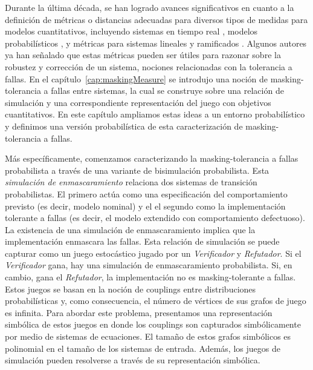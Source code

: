 Durante la última década, se han logrado avances significativos en cuanto a la definición de métricas o distancias adecuadas para diversos tipos de medidas para modelos cuantitativos, incluyendo sistemas en tiempo real \cite{HenzingerMP05}, modelos probabilísticos \cite{Bacci0LM17,BacciBLMTB19,DesharnaisGJP04,DesharnaisLT11,TangB18},
y métricas para sistemas lineales y ramificados \cite{CernyHR12,AlfaroFS09,Henzinger13,LarsenFT11,ThraneFL10}.
Algunos autores ya han señalado que estas métricas pueden ser útiles para razonar
sobre la robustez y corrección de un sistema, nociones relacionadas con la tolerancia a fallas.
En el capítulo~\ref{cap:maskingMeasure} se introdujo una noción de masking-tolerancia a fallas
entre sistemas, la cual se construye sobre una relación de simulación y una correspondiente
representación del juego con objetivos cuantitativos. En este capítulo ampliamos estas ideas a un entorno probabilístico y definimos una versión probabilística de
esta caracterización de masking-tolerancia a fallas.

Más específicamente, comenzamos caracterizando la masking-tolerancia a fallas probabilista a través de una variante de bisimulación probabilista. Esta \emph{simulación de enmascaramiento} relaciona dos sistemas de transición probabilistas. El primero actúa como una especificación del comportamiento previsto (es decir, modelo nominal) y el
el segundo como la implementación tolerante a fallas (es decir, el modelo extendido con comportamiento defectuoso). La existencia de una simulación de enmascaramiento implica
que la implementación enmascara las fallas. Esta relación de simulación se puede capturar como un juego estocástico jugado por un
\emph{Verificador} y \emph{Refutador}. Si el \emph{Verificador} gana, hay una simulación de enmascaramiento probabilista.
Si, en cambio, gana el \emph{Refutador}, la implementación no es masking-tolerante a fallas.
Estos juegos se basan en la noción de couplings entre distribuciones probabilísticas y, como consecuencia, el número de vértices de sus grafos de juego es infinita. Para abordar este problema, presentamos una representación simbólica de estos juegos en donde los couplings son capturados simbólicamente por medio de sistemas de ecuaciones.
El tamaño de estos grafos simbólicos
es polinomial en el tamaño de los sistemas de entrada. Además, los juegos de simulación
pueden resolverse a través de su representación simbólica.

